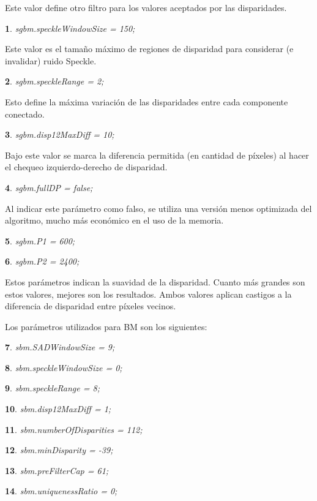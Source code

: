 \documentclass[11pt,a4paper,titlepage]{article}
\newtheorem{mytheorem}{}
\newenvironment{theorem}%
  {\begin{lrbox}{\thmbox}%
   \begin{minipage}{\dimexpr\linewidth-2\fboxsep}
   \begin{mytheorem}}%
  {\end{mytheorem}%
   \end{minipage}%
   \end{lrbox}%
   \begin{trivlist}
     \item[]\colorbox{lightgray}{\usebox\thmbox}
   \end{trivlist}}
\begin{document}
Este valor define otro filtro para los valores aceptados por las disparidades.

\begin{theorem}
sgbm.speckleWindowSize = 150;
\end{theorem}

Este valor es el tamaño máximo de regiones de disparidad para considerar (e invalidar) ruido Speckle.

\begin{theorem}
sgbm.speckleRange = 2;
\end{theorem}

Esto define la máxima variación de las disparidades entre cada componente conectado.

\begin{theorem}
sgbm.disp12MaxDiff = 10;
\end{theorem}

Bajo este valor se marca la diferencia permitida (en cantidad de píxeles) al hacer el chequeo izquierdo-derecho de disparidad.

\begin{theorem}
sgbm.fullDP = false;
\end{theorem}

Al indicar este parámetro como falso, se utiliza una versión menos optimizada del algoritmo, mucho más económico en el uso de la memoria.

\begin{theorem}
sgbm.P1 = 600;
\end{theorem}
\begin{theorem}
sgbm.P2 = 2400;
\end{theorem}

Estos parámetros indican la suavidad de la disparidad. Cuanto más grandes son estos valores, mejores son los resultados. Ambos valores aplican castigos a la diferencia de disparidad entre píxeles vecinos.


Los parámetros utilizados para BM son los siguientes:

\begin{theorem}
sbm.SADWindowSize = 9;
\end{theorem}
\begin{theorem}
sbm.speckleWindowSize = 0;
\end{theorem}
\begin{theorem}
sbm.speckleRange = 8;
\end{theorem}
\begin{theorem}
sbm.disp12MaxDiff = 1;
\end{theorem}
\begin{theorem}
sbm.numberOfDisparities = 112;
\end{theorem}
\begin{theorem}
sbm.minDisparity = -39;
\end{theorem}
\begin{theorem}
sbm.preFilterCap = 61;
\end{theorem}
\begin{theorem}
sbm.uniquenessRatio = 0;
\end{theorem}
\end{document}
